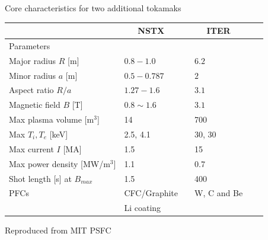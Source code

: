 \documentclass{beamer}
\begin{document}
\begin{frame}{Core characteristics for two additional tokamaks}
\begin{table}\centering
\begin{tabular}{@{}llclcl@{}}\toprule[2 pt]
& \multicolumn{1}{c}{NSTX}  && \multicolumn{1}{c}{ITER} \\
\midrule
\phantom{a}Parameters & &&  \\
\phantom{a}Major radius $R$ [m] 	&	$0.8-1.0$	 && 	$6.2$		\\
\phantom{a}Minor radius $a$ [m] 	&	$0.5-0.787$	 &&     $2$	        \\
\phantom{a}Aspect ratio	$R/a$           &       $1.27-1.6$	 && 	$3.1$		\\
\phantom{a}Magnetic field $B$ [T]       &  	$0.8 \sim 1.6$	 && 	$3.1$		\\
\phantom{a}Max plasma volume [$\text{m}^3$]	&14        	 && 	700		\\
\phantom{a}Max  $T_i, T_e$ [keV]	&	2.5, 4.1	 && 	30, 30		\\
\phantom{a}Max current $I$ [MA]         &	1.5        	 && 	15		\\
\phantom{a}Max power density [MW/$\text{m}^3$] &	1.1	         && 	0.7		\\
\phantom{a}Shot length [s] at $B_{max}$  &	1.5        	 && 	400		\\
\phantom{a}PFCs	                        &	CFC/Graphite	 && 	W, C and Be	\\
	                                &	Li coating	 && 			\\
\bottomrule[2 pt]
\end{tabular}
\label{tbl:tokamak_params_juxtaposition}
\end{table}

\tiny{Reproduced from MIT PSFC}

\end{frame}

\end{document}
